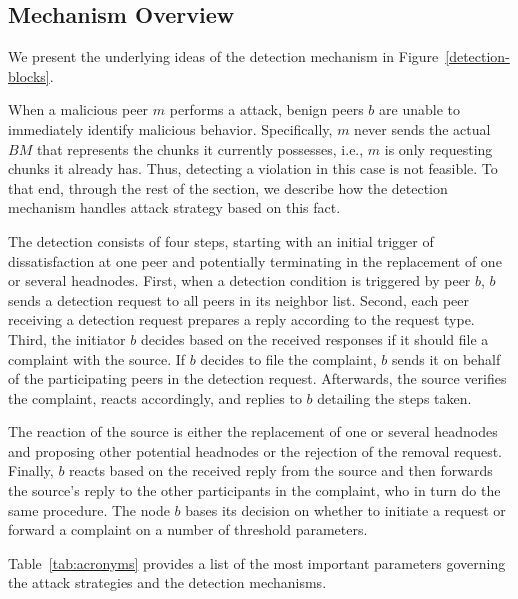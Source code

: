 \subsection{Mechanism Overview}
We present the underlying ideas of the detection mechanism in Figure~\ref{detection-blocks}.

When a malicious peer $m$ performs a \drop attack, benign peers $b$ are unable to immediately identify malicious behavior.
Specifically, $m$ never sends the actual $BM$ that represents the chunks it currently possesses, i.e., $m$ is only requesting chunks it already has.
Thus, detecting a violation in this case is not feasible. 
To that end, through the rest of the section, we describe how the detection mechanism handles \drop attack strategy based on this fact.

The detection consists of four steps, starting with an initial trigger of dissatisfaction at one peer and potentially terminating in the replacement of one or several headnodes. 
First, when a detection condition is triggered by peer $b$, $b$ sends a detection request to all peers in its neighbor list.
Second, each peer receiving a detection request prepares a reply according to the request type.
Third, the initiator $b$ decides based on the received responses if it should file a complaint with the source.
If $b$ decides to file the complaint, $b$ sends it on behalf of the participating peers in the detection request. 
Afterwards, the source verifies the complaint, reacts accordingly, and replies to $b$ detailing the steps taken. 

The reaction of the source is either the replacement of one or several headnodes and proposing other potential headnodes or the rejection of the removal request.
Finally, $b$ reacts based on the received reply from the source and then forwards the source's reply to the other participants in the complaint, who in turn do the same procedure.
The node $b$ bases its decision on whether to initiate a request or forward a complaint on a number of threshold parameters. 

Table~\ref{tab:acronyms} provides a list of the most important parameters governing the attack strategies and the detection mechanisms. 


% 
% 
% 


